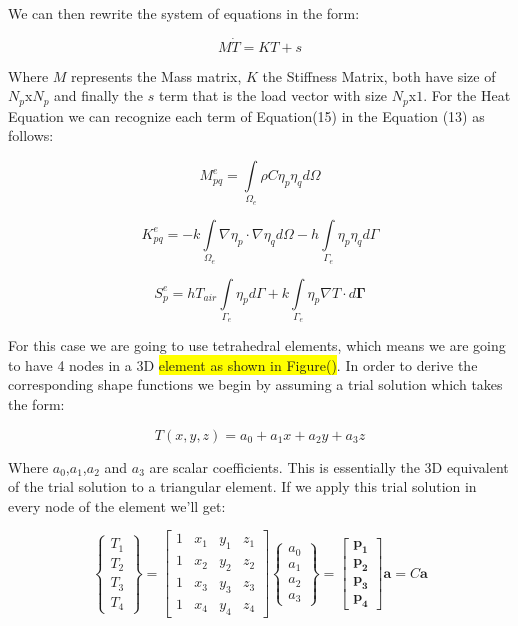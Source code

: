 \documentclass[12pt]{article}
\newcommand{\hilight}[1]{\colorbox{yellow}{#1}}
\begin{document}
We can then rewrite the system of equations in the form:

\begin{equation}
 M\dot{T} = KT + s
\end{equation}

Where $M$ represents the Mass matrix, $K$ the Stiffness Matrix, both have size of $N_p$x$N_p$ and finally the $s$ term that is the load vector with size $N_p$x$1$. For the Heat Equation we can recognize each term of Equation(15) in the Equation (13) as follows:

\begin{equation}
 M_{pq}^e = \int\limits_{\Omega_e} \rho C \eta_p\eta_q  d\Omega
\end{equation}

\begin{equation}
 K_{pq}^e = - k \int\limits_{\Omega_e} \nabla \eta_p \cdot \nabla \eta_q d\Omega - h \int\limits_{\Gamma_e} \eta_p \eta_q d\Gamma
\end{equation}

\begin{equation}
 S_{p}^e = h T_{air} \int\limits_{\Gamma_e} \eta_p d\Gamma + k \int\limits_{\Gamma_{e}}{\eta_p\nabla T} \cdot d \mathbf{\Gamma}
\end{equation}

For this case we are going to use tetrahedral elements, which means we are going to have 4 nodes in a 3D \hilight{element as shown in Figure()}. In order to derive the corresponding shape functions we begin by assuming a trial solution which takes the form:

\begin{equation}
T(x,y,z) = a_0+a_1x+a_2y+a_3z
\end{equation}

Where $a_0$,$a_1$,$a_2$ and $a_3$ are scalar coefficients. This is essentially the 3D equivalent of the trial solution to a triangular element. If we apply this trial solution in every node of the element we'll get:

\begin{equation}
\begin{Bmatrix} T_1 \\ T_2 \\ T_3 \\ T_4 \end{Bmatrix} = 
\begin{bmatrix} 1 & x_1 & y_1 & z_1 \\ 1 & x_2 & y_2 & z_2 \\ 1 & x_3 & y_3 & z_3 \\ 1 & x_4 & y_4 & z_4\end{bmatrix}
\begin{Bmatrix} a_0 \\ a_1 \\ a_2 \\ a_3 \end{Bmatrix} =
\begin{bmatrix} \mathbf{p_1} \\ \mathbf{p_2} \\ \mathbf{p_3} \\ \mathbf{p_4} \end{bmatrix}\mathbf{a} = C\mathbf{a}
\end{equation}
\end{document}
